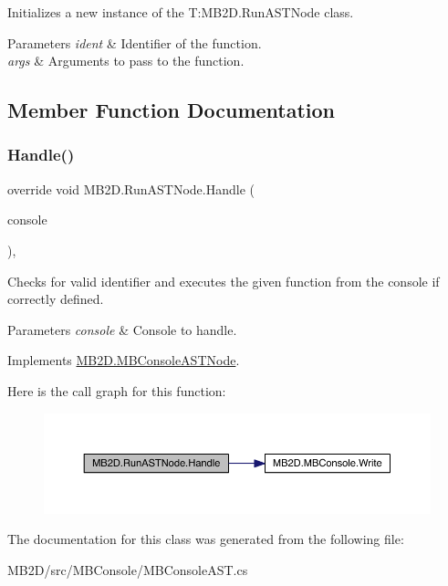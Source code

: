 Initializes a new instance of the T\+:\+M\+B2\+D.\+Run\+A\+S\+T\+Node class. 


\begin{DoxyParams}{Parameters}
{\em ident} & Identifier of the function.\\
\hline
{\em args} & Arguments to pass to the function.\\
\hline
\end{DoxyParams}


\subsection{Member Function Documentation}
\hypertarget{class_m_b2_d_1_1_run_a_s_t_node_a20845d86608c81357f4347c29dcaf2c8}{}\label{class_m_b2_d_1_1_run_a_s_t_node_a20845d86608c81357f4347c29dcaf2c8} 
\subsubsection{\texorpdfstring{Handle()}{Handle()}}
{\footnotesize\ttfamily override void M\+B2\+D.\+Run\+A\+S\+T\+Node.\+Handle (\begin{DoxyParamCaption}\item[{\hyperlink{class_m_b2_d_1_1_m_b_console}{M\+B\+Console}}]{console }\end{DoxyParamCaption})\hspace{0.3cm}{\ttfamily [inline]}, {\ttfamily [virtual]}}



Checks for valid identifier and executes the given function from the console if correctly defined. 


\begin{DoxyParams}{Parameters}
{\em console} & Console to handle.\\
\hline
\end{DoxyParams}


Implements \hyperlink{class_m_b2_d_1_1_m_b_console_a_s_t_node_aa70a49e61ab623698af4ed8fda4ebbf5}{M\+B2\+D.\+M\+B\+Console\+A\+S\+T\+Node}.

Here is the call graph for this function\+:\nopagebreak
\begin{figure}[H]
\begin{center}
\leavevmode
\includegraphics[width=350pt]{class_m_b2_d_1_1_run_a_s_t_node_a20845d86608c81357f4347c29dcaf2c8_cgraph}
\end{center}
\end{figure}


The documentation for this class was generated from the following file\+:\begin{DoxyCompactItemize}
\item 
M\+B2\+D/src/\+M\+B\+Console/M\+B\+Console\+A\+S\+T.\+cs\end{DoxyCompactItemize}
